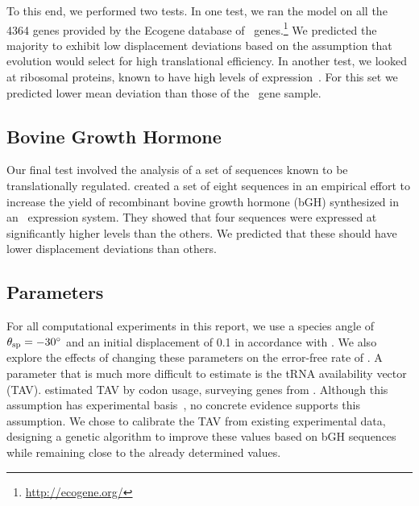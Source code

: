 \documentclass[twocolumn]{article}
\begin{document}
To this end, we performed two tests. In one test, we ran the model on
all the 4364 genes provided by the Ecogene database of
\ecoli\ genes.\footnote{\url{http://ecogene.org/}}
We predicted the majority to exhibit low
displacement deviations based on the assumption that evolution would select
for high translational efficiency. In another
test, we looked at ribosomal proteins, known to have high levels of
expression~\cite{rpoS:process}. For this set we predicted lower mean
deviation than those of the \ecoli\ gene sample.
	
\subsection{Bovine Growth Hormone}
Our final test involved the analysis of a set of sequences known to 
be translationally regulated.  \citet{schoner:bgh} created a set 
of eight sequences in an empirical effort to increase the yield 
of recombinant bovine growth hormone (bGH) synthesized in an 
\ecoli\ expression system. They
showed that four sequences were expressed 
at significantly higher levels than the others. We predicted that 
these should have lower displacement deviations than others.

\subsection{Parameters}
\label{section:parameters}
For all computational experiments in this report, we use a species
angle of $\theta_{\rm{sp}} = -30^\circ$ and an initial displacement of 0.1
in accordance with \citet{lalit:mechanics}.
We also explore the effects of changing these parameters on the
error-free rate of \prfB.
A parameter that is much more difficult to estimate
is the tRNA availability vector (TAV).
\citeauthor{lalit:mechanics} estimated TAV by codon usage, 
surveying genes from \ecoli.
Although this assumption has experimental basis~\cite{ikemura}, 
no concrete evidence supports this assumption.
We chose to calibrate the TAV from existing experimental data, 
designing a genetic algorithm to improve these values based on 
bGH sequences while remaining close 
to the already determined values.
\end{document}
